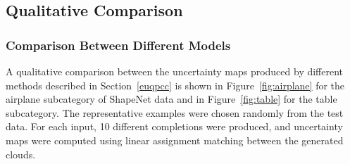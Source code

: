     \subsection{Qualitative Comparison}\label{quali}

        \subsubsection{Comparison Between Different Models}
        A qualitative comparison between the uncertainty maps produced by different methods described in Section~\ref{euqpcc} is shown in Figure~\ref{fig:airplane} for the airplane subcategory of ShapeNet data and in Figure~\ref{fig:table} for the table subcategory. The representative examples were chosen randomly from the test data. For each input, 10 different completions were produced, and uncertainty maps were computed using linear assignment matching between the generated clouds.
